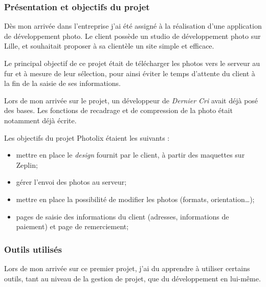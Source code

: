 \subsubsection{Présentation et objectifs du
projet}\label{pruxe9sentation-et-objectifs-du-projet}

\bigskip

Dès mon arrivée dans l'entreprise j'ai été assigné à la réalisation
d'une application de développement photo. Le client possède un studio de
développement photo sur Lille, et souhaitait proposer à sa clientèle un
site simple et efficace.

\bigskip

Le principal objectif de ce projet était de télécharger les photos vers
le serveur au fur et à mesure de leur sélection, pour ainsi éviter le
temps d'attente du client à la fin de la saisie de ses informations.

\bigskip

Lors de mon arrivée sur le projet, un développeur de \emph{Dernier Cri}
avait déjà posé des bases. Les fonctions de recadrage et de compression
de la photo était notamment déjà écrite.

\bigskip

Les objectifs du projet Photolix étaient les suivants :

\begin{itemize}
\tightlist
\item
  mettre en place le \emph{design} fournit par le client, à partir des
  maquettes sur Zeplin;
\item
  gérer l'envoi des photos au serveur;
\item
  mettre en place la possibilité de modifier les photos (formats,
  orientation\ldots{});
\item
  pages de saisie des informations du client (adresses, informations de
  paiement) et page de remerciement;
\end{itemize}

\bigskip

\subsubsection{Outils utilisés}\label{outils-utilisuxe9s}

\bigskip

Lors de mon arrivée sur ce premier projet, j'ai du apprendre à utiliser
certains outils, tant au niveau de la gestion de projet, que du
développement en lui-même.

\bigskip

